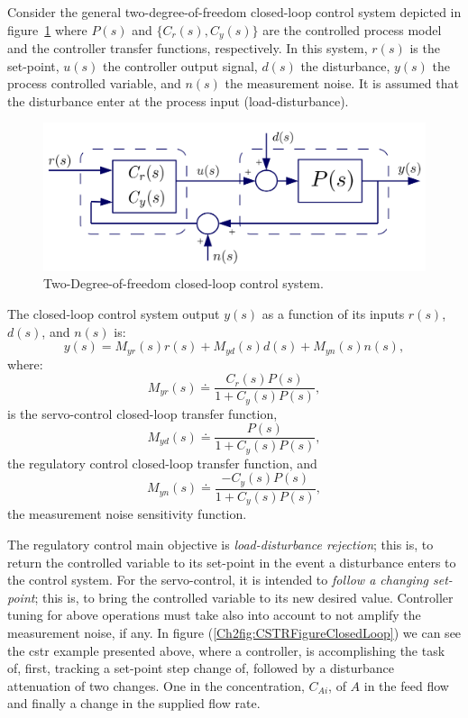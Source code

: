 Consider the general two-degree-of-freedom closed-loop control system depicted in figure~\ref{Ch2fig:DoFControlSystem} where $P(s)$ and $\{C_r(s), C_y(s)\}$ are the controlled process model and the controller transfer functions, respectively.  In this system, $r(s)$ is the set-point, $u(s)$ the controller output signal, $d(s)$ the disturbance, $y(s)$ the process controlled variable, and $n(s)$ the measurement noise. It is assumed that the disturbance enter at the process input (load-disturbance).
%
\begin{figure}[tb]
\centering
	\includegraphics[width=0.8\linewidth]{../figuras/Ch2DoFControlSystem} 
\caption{Two-Degree-of-freedom closed-loop control system.} 
\label{Ch2fig:DoFControlSystem}
\end{figure}

The closed-loop control system output $y(s)$ as a function of its inputs $r(s)$, $d(s)$, and $n(s)$ is:
%
\begin{equation}
	y(s) = M_{yr}(s) r(s) + M_{yd}(s) d(s) + M_{yn}(s) n(s), \label{Ch2eq:yt}
\end{equation}
%
where:
\begin{equation}
	M_{yr}(s) \doteq \frac{C_r(s)P(s)}{1+C_y(s)P(s)}, \label{Ch2eq:myr}
\end{equation}
%
is the servo-control closed-loop transfer function, 
\begin{equation}
	M_{yd}(s) \doteq \frac{P(s)}{1+C_y(s)P(s)}, \label{Ch2eq:myd}
\end{equation}
%
the regulatory control closed-loop transfer function, and
\begin{equation}
	M_{yn}(s) \doteq \frac{-C_y(s)P(s)}{1+C_y(s)P(s)}, \label{Ch2eq:myn}
\end{equation}
%
the measurement noise sensitivity function.

The regulatory control main objective is \emph{load-disturbance rejection}; this is, to return the controlled variable to its set-point in the event a disturbance enters to the control system.  For the servo-control, it is intended to \emph{follow a changing set-point}; this is, to bring the controlled variable to its new desired value. Controller tuning for above operations must take also into account to not amplify the measurement noise, if any.  In figure (\ref{Ch2fig:CSTRFigureClosedLoop}) we can see the \gls{cstr} example presented above, where a controller, is accomplishing the task of, first, tracking a set-point step change of, followed by a disturbance attenuation  of two changes. One  in the concentration, $C_{Ai}$, of $A$ in the feed flow and finally a change in the supplied flow rate.

